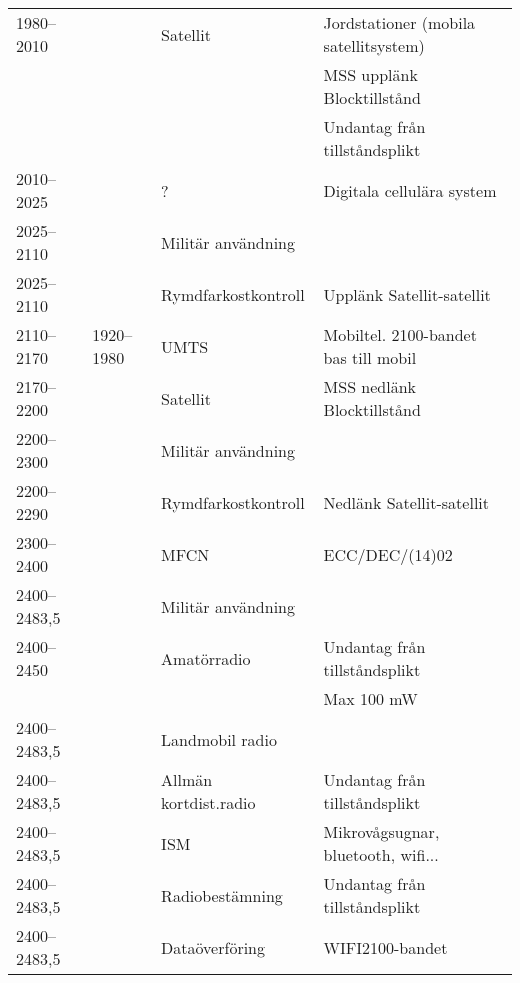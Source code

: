 \begin{landscape}
\begin{longtable}{llll}
	1980--2010         &                    & Satellit                & Jordstationer (mobila satellitsystem)    \\
	                   &                    &                         & MSS upplänk Blocktillstånd               \\
	                   &                    &                         & Undantag från tillståndsplikt            \\
	2010--2025         &                    & ?                       & Digitala cellulära system                \\
	2025--2110         &                    & Militär användning      &  \\
	2025--2110         &                    & Rymdfarkostkontroll     & Upplänk Satellit-satellit                \\
	2110--2170         & 1920--1980         & UMTS                    & Mobiltel. 2100-bandet bas till mobil \\
	2170--2200         &                    & Satellit                & MSS nedlänk Blocktillstånd               \\
	2200--2300         &                    & Militär användning      &  \\
	2200--2290         &                    & Rymdfarkostkontroll     & Nedlänk Satellit-satellit                \\
	2300--2400         &                    & MFCN                    & ECC/DEC/(14)02                           \\
	2400--2483,5       &                    & Militär användning      &  \\
	2400--2450         &                    & Amatörradio             & Undantag från tillståndsplikt            \\
	                   &                    &                         & Max 100 mW                               \\
	2400--2483,5       &                    & Landmobil radio         &  \\
	2400--2483,5       &                    & Allmän kortdist.radio   & Undantag från tillståndsplikt            \\
	2400--2483,5       &                    & ISM                     & Mikrovågsugnar, bluetooth, wifi...        \\
	2400--2483,5       &                    & Radiobestämning         & Undantag från tillståndsplikt            \\
	2400--2483,5       &                    & Dataöverföring          & WIFI2100-bandet                          \\

\end{longtable}
\end{landscape}
